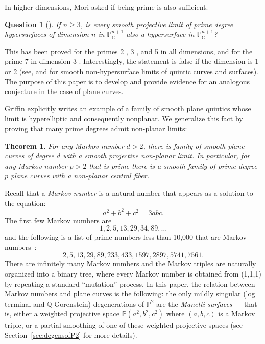 \documentclass[JEP,XML,SOM,Unicode,NoFloatCountersInSection,published]{cedram}
\theoremstyle{plain}
\newtheorem{Theorem}{Theorem}
\newtheorem*{question}{Question}
\theoremstyle{definition}
\newcommand\CC{{\mathbb C}}
\newcommand\PP{{\mathbb{P}}}
\newcommand\QQ{{\mathbb Q}}
\begin{document}
In higher dimensions, Mori asked if being prime is also sufficient.

\begin{question}[{\cite[p.\,642]{Moriconjecture}}]
If $n\ge 3$, is every smooth projective limit of prime degree hypersurfaces of dimension $n$ in $\PP^{n+1}_\CC$ also a hypersurface in $\PP^{n+1}_\CC$?
\end{question}

\noindent This has been proved for the primes 2 \cite{Quadric1,Quadric2,Quadric3}, 3 \cite{Cubic}, and 5 \cite{OttemSchreieder} in all dimensions, and for the prime 7 in dimension 3 \cite{OttemSchreieder}. Interestingly, the statement is false if the dimension is 1 or 2 (see, \eg \cite{Griffin} and \cite{Horikawa} for smooth non-hypersurface limits of quintic curves and surfaces). The purpose of this paper is to develop and provide evidence for an analogous conjecture in the case of plane curves.

Griffin explicitly writes an example \cite{Griffin} of a family of smooth plane quintics whose limit is hyperelliptic and consequently nonplanar. We generalize this fact by proving that many prime degrees admit non-planar limits:

\begin{Theorem}\label{thmA:nonplanarlimits}
For any Markov number $d >2$, there is family of smooth plane curves of degree $d$ with a smooth projective non-planar limit. In particular, for any Markov number $p>2$ that is prime there is a smooth family of prime degree $p$ plane curves with a non-planar central fiber.
\end{Theorem}

Recall that a \textit{Markov number} is a natural number that appears as a solution to the equation:
\[
a^2+b^2+c^2=3abc.
\]
The first few Markov numbers are
\[
1,2,5,13,29,34,89,\dots
\]
and the following is a list of prime numbers less than 10,000 that are Markov numbers~\cite{oeis}:
\[
2, 5, 13, 29, 89, 233, 433, 1597, 2897, 5741, 7561.
\]
There are infinitely many Markov numbers and the Markov triples are naturally organized into a binary tree, where every Markov number is obtained from (1,1,1) by repeating a standard ``mutation'' process. In this paper, the relation between Markov numbers and plane curves is the following: the only mildly singular (log terminal and $\QQ$-Gorenstein) degenerations of $\PP^2$ are the \textit{Manetti surfaces} --- that is, either a weighted projective space $\PP(a^2,b^2,c^2)$ where $(a,b,c)$ is a Markov triple, or a partial smoothing of one of these weighted projective spaces (see Section~\ref{sec:degensofP2} for more details).
\end{document}
